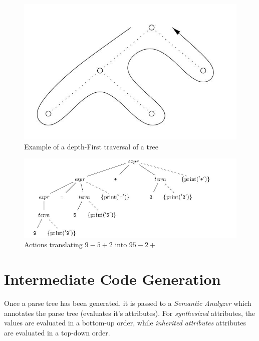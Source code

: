 \documentclass[12pt]{article}
\begin{document}
		\begin{figure}[h!]
			\begin{center}\includegraphics[scale=0.7]{postorder.jpg}\end{center}
			\caption{Example of a depth-First traversal of a tree}
	  		\label{fig:postorder2}
		\end{figure}

	\newpage

		\begin{figure}[h!]
			\begin{center}\includegraphics[scale=0.8]{eval.jpg}\end{center}
			\caption{Actions translating $9-5+2$ into $95-2+$}
	  		\label{fig:eval3}
		\end{figure}

\section{Intermediate Code Generation}
	Once a parse tree has been generated, it is passed to a \emph{Semantic Analyzer} which annotates the parse tree (evaluates it's attributes). For \emph{synthesized} attributes, the values are evaluated in a bottom-up order, while \emph{inherited attributes} attributes are evaluated in a top-down order.
\end{document}
